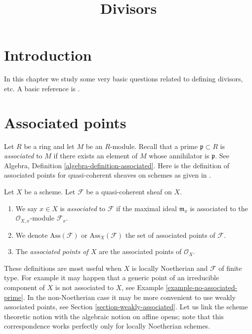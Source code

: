 

%


\title{Divisors}


\maketitle

\label{section-phantom}

\tableofcontents

\section{Introduction}
\label{section-introduction}

\noindent
In this chapter we study some very basic questions related
to defining divisors, etc. A basic reference is \cite{EGA}.



\section{Associated points}
\label{section-associated}

\noindent
Let $R$ be a ring and let $M$ be an $R$-module.
Recall that a prime $\mathfrak p \subset R$ is {\it associated} to $M$
if there exists an element of $M$ whose annihilator is $\mathfrak p$.
See Algebra, Definition \ref{algebra-definition-associated}.
Here is the definition of associated points
for quasi-coherent sheaves on schemes
as given in \cite[IV Definition 3.1.1]{EGA}.

\begin{definition}
\label{definition-associated}
Let $X$ be a scheme.
Let $\mathcal{F}$ be a quasi-coherent sheaf on $X$.
\begin{enumerate}
\item We say $x \in X$ is {\it associated} to $\mathcal{F}$
if the maximal ideal
$\mathfrak m_x$ is associated to the $\mathcal{O}_{X, x}$-module
$\mathcal{F}_x$.
\item We denote $\text{Ass}(\mathcal{F})$ or $\text{Ass}_X(\mathcal{F})$
the set of associated points of $\mathcal{F}$.
\item The {\it associated points of $X$} are the associated
points of $\mathcal{O}_X$.
\end{enumerate}
\end{definition}

\noindent
These definitions are most useful when $X$ is locally Noetherian
and $\mathcal{F}$ of finite type.
For example it may happen that a generic point of an irreducible
component of $X$ is not associated to $X$, see
Example \ref{example-no-associated-prime}.
In the non-Noetherian case it may be more convenient to use weakly
associated points, see
Section \ref{section-weakly-associated}.
Let us link the scheme theoretic notion with the algebraic notion
on affine opens; note that this correspondence works perfectly only
for locally Noetherian schemes.

